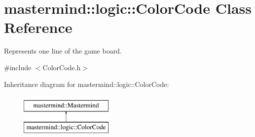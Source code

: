 \hypertarget{classmastermind_1_1logic_1_1_color_code}{}\section{mastermind\+:\+:logic\+:\+:Color\+Code Class Reference}
\label{classmastermind_1_1logic_1_1_color_code}


Represents one line of the game board.  




{\ttfamily \#include $<$Color\+Code.\+h$>$}

Inheritance diagram for mastermind\+:\+:logic\+:\+:Color\+Code\+:\begin{figure}[H]
\begin{center}
\leavevmode
\includegraphics[height=2.000000cm]{classmastermind_1_1logic_1_1_color_code}
\end{center}
\end{figure}
